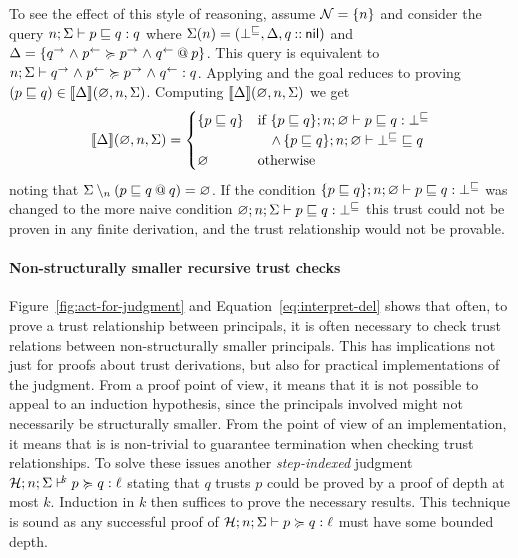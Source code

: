 To see the effect of this style of reasoning, assume $\Nameset = \{n\}$ and consider the query $\flowstoquery{n; \env}{p}{q}{q}$ where $\env(n) = (\bot^{\flowsto}, \scope, \cons{q}{\nil})$ and $\scope = \{\lb{p}{\conf{q} \conj \integ{p} \actsfor \conf{p} \conj \integ{q}}\}$. This query is equivalent to $\actsforquery{n; \env}{\conf{q} \conj \integ{p}}{\conf{p} \conj \integ{q}}{q}$. Applying  and  the goal reduces to proving $(p \flowsto q) \in \llbracket \scope \rrbracket(\varnothing, n, \env)$. Computing $\llbracket \scope \rrbracket(\varnothing, n, \env)$ we get
\begin{align*}
\llbracket \scope \rrbracket(\varnothing, n, \env) =
\begin{cases}
\{p \flowsto q \} &\text{if } \flowstoquery{\{p \flowsto q\}; n; \emptyenv}{p}{q}{\bot^{\flowsto}} \\
&\quad \wedge \, \nopostflowstoquery{\{p \flowsto q\}; n; \emptyenv}{\bot^{\flowsto}}{q} \\
\varnothing &\text{otherwise}
\end{cases}
\end{align*}
noting that $\env \setminus_{n} (\lb{q}{p \flowsto q}) = \emptyenv$. If the condition $\flowstoquery{\{p \flowsto q\}; n; \emptyenv}{p}{q}{\bot^{\flowsto}}$ was changed to the more naive condition $\flowstoquery{\varnothing; n; \env}{p}{q}{\bot^{\flowsto}}$ this trust could not be proven in any finite derivation, and the trust relationship would not be provable.

\paragraph{Non-structurally smaller recursive trust checks}
Figure~\ref{fig:act-for-judgment} and Equation~\eqref{eq:interpret-del} shows that often, to prove a trust relationship between principals, it is often necessary to check trust relations between non-structurally smaller principals. This has implications not just for proofs about trust derivations, but also for practical implementations of the judgment. From a proof point of view, it means that it is not possible to appeal to an induction hypothesis, since the principals involved might not necessarily be structurally smaller. From the point of view of an implementation, it means that is is non-trivial to guarantee termination when checking trust relationships. To solve these issues another \emph{step-indexed} judgment $\actsforquerycount{\Assumps; n; \env}{p}{q}{\level}{k}$ stating that $q$ trusts $p$ could be proved by a proof of depth at most $k$. Induction in $k$ then suffices to prove the necessary results. This technique is sound as any successful proof of $\actsforquery{\Assumps; n; \env}{p}{q}{\level}$ must have some bounded depth.

